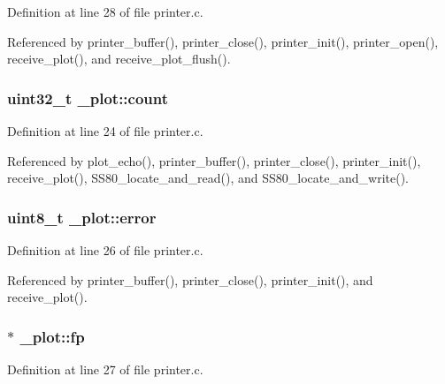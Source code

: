 Definition at line 28 of file printer.\+c.



Referenced by printer\+\_\+buffer(), printer\+\_\+close(), printer\+\_\+init(), printer\+\_\+open(), receive\+\_\+plot(), and receive\+\_\+plot\+\_\+flush().

\subsubsection[{\texorpdfstring{count}{count}}]{\setlength{\rightskip}{0pt plus 5cm}uint32\+\_\+t \+\_\+plot\+::count}\hypertarget{struct__plot_af4d84e2aa52eabdc7ccc2fbf18272e98}{}\label{struct__plot_af4d84e2aa52eabdc7ccc2fbf18272e98}


Definition at line 24 of file printer.\+c.



Referenced by plot\+\_\+echo(), printer\+\_\+buffer(), printer\+\_\+close(), printer\+\_\+init(), receive\+\_\+plot(), S\+S80\+\_\+locate\+\_\+and\+\_\+read(), and S\+S80\+\_\+locate\+\_\+and\+\_\+write().

\subsubsection[{\texorpdfstring{error}{error}}]{\setlength{\rightskip}{0pt plus 5cm}uint8\+\_\+t \+\_\+plot\+::error}\hypertarget{struct__plot_a9a9516230fefbc6cdd6e4ca5d6403509}{}\label{struct__plot_a9a9516230fefbc6cdd6e4ca5d6403509}


Definition at line 26 of file printer.\+c.



Referenced by printer\+\_\+buffer(), printer\+\_\+close(), printer\+\_\+init(), and receive\+\_\+plot().

\subsubsection[{\texorpdfstring{fp}{fp}}]{$\ast$ \+\_\+plot\+::fp}\hypertarget{struct__plot_aec1bc5aae9d9c56584ee0cbb31515ac6}{}\label{struct__plot_aec1bc5aae9d9c56584ee0cbb31515ac6}


Definition at line 27 of file printer.\+c.



